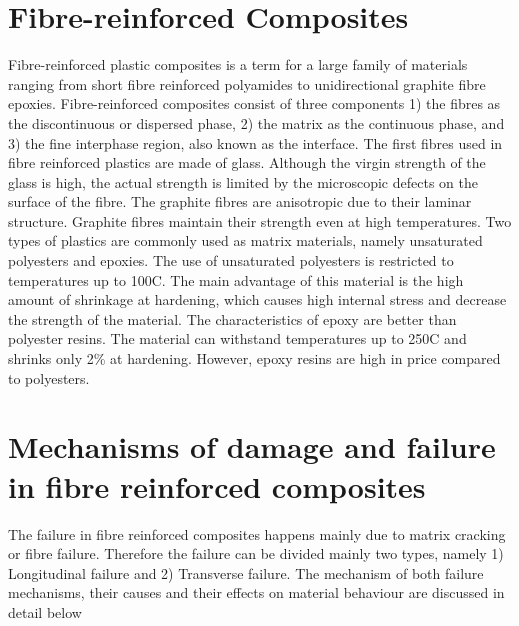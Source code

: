 \documentclass[12pt,twoside]{report}
\begin{document}
\section{Fibre-reinforced Composites}
\indent\indent\indent  Fibre-reinforced plastic composites is a term for a large family of materials ranging from short fibre reinforced polyamides to unidirectional graphite fibre epoxies. Fibre-reinforced composites consist of three components 1) the fibres as the discontinuous or dispersed phase, 2) the matrix as the continuous phase, and 3) the fine interphase region, also known as the interface.  The first fibres used in fibre reinforced plastics are made of glass. Although the virgin strength of the glass is high, the actual strength is limited by the microscopic defects on the surface of the fibre. The graphite fibres are anisotropic due to their laminar structure. Graphite fibres maintain their strength even at high temperatures. Two types of plastics are commonly used as matrix materials, namely unsaturated polyesters and epoxies. The use of unsaturated polyesters is restricted to temperatures up to 100C. The main advantage of this material is the high amount of shrinkage at hardening, which causes high internal stress and decrease the strength of the material.  The characteristics of epoxy are better than polyester resins. The material can withstand temperatures up to 250C and shrinks only  2\%  at hardening. However, epoxy resins are high in price compared to polyesters.


\section{Mechanisms of damage and failure in fibre reinforced composites}
\indent\indent\indent The failure in fibre reinforced composites happens mainly due to matrix cracking or fibre failure. Therefore the failure can be divided mainly two types, namely 1) Longitudinal failure and 2) Transverse failure. The mechanism of both failure mechanisms, their causes and their effects on material behaviour are discussed in detail below
\end{document}
